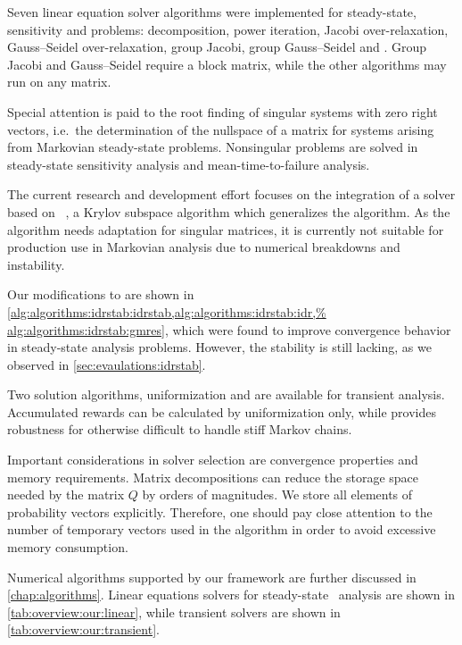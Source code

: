 Seven linear equation solver algorithms were implemented for
steady-state, sensitivity and  problems:
 decomposition, power iteration, Jacobi over-relaxation,
Gauss--Seidel over-relaxation, group Jacobi, group Gauss--Seidel and
. Group Jacobi and Gauss--Seidel require a block
matrix, while the other algorithms may run on any matrix.

Special attention is paid to the root finding of singular systems with
zero right vectors, i.e.~the determination of the nullspace of a
matrix for systems arising from Markovian steady-state
problems. Nonsingular problems are solved in steady-state sensitivity
analysis and mean-time-to-failure analysis.

The current research and development effort focuses on the integration
of a solver based on %
~\citep{sleijpen2010exploiting}, a Krylov subspace algorithm which
generalizes the  algorithm. As the algorithm needs
adaptation for singular matrices, it is currently not suitable for
production use in Markovian analysis due to numerical breakdowns and
instability.

Our modifications to  are shown in
\vref{alg:algorithms:idrstab:idrstab,alg:algorithms:idrstab:idr,%
  alg:algorithms:idrstab:gmres}, which were found to improve
convergence behavior in steady-state analysis problems. However, the
stability is still lacking, as we observed in
\vref{sec:evaulations:idrstab}.

Two solution algorithms, uniformization and 
are available for transient analysis. Accumulated rewards can be
calculated by uniformization only, while  provides
robustness for otherwise difficult to handle stiff Markov chains.

Important considerations in solver selection are convergence
properties and memory requirements. Matrix decompositions
can reduce the storage space needed by the matrix $Q$ by orders of
magnitudes. We store all elements of probability vectors
explicitly. Therefore, one should pay close attention to the number
of temporary vectors used in the algorithm in order to avoid
excessive memory consumption.

Numerical algorithms supported by our framework are further discussed
in \cref{chap:algorithms}. Linear equations solvers for steady-state
\CTMC\ analysis are shown in \cref{tab:overview:our:linear}, while
transient solvers are shown in \cref{tab:overview:our:transient}.
